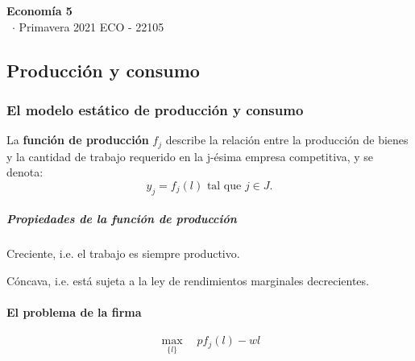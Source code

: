 \documentclass[8pt,a4paper]{extarticle}
\renewcommand{\csClass}{Economía 5}
\renewcommand{\csClassCode}{ECO - 22105}
\renewcommand{\csTerm}{Primavera 2021}
\begin{document}
\begin{titlepage}
	\begin{center}
		\vspace*{1cm}
		\Huge
		\textbf{\csClass}
		\vspace{0.5cm} \\
		\Large
		\cs\ $\cdot$ \csTerm
		\vfill
		\csAuthorName
		\vspace{0.8cm}
		\csClassCode\\
		\csSchool
	\end{center}
\end{titlepage}

\begin{multicols}{3}
	\setcounter{page}{1}

	\part{Producción y consumo}

	\section{El modelo estático de producción y consumo}

	\begin{boxdef}
		La \textbf{función de producción} $f_j$ describe la relación entre la producción de bienes y la cantidad de trabajo requerido en la j-ésima empresa competitiva, y se denota:
		\[
			y_j = f_j(l) \text{ tal que } j \in J
			.\]
	\end{boxdef}

	\subsubsection*{Propiedades de la función de producción}

	\begin{eqlist}
		\item Creciente, i.e. el trabajo es siempre productivo.
		\item Cóncava, i.e. está sujeta a la ley de rendimientos marginales decrecientes.
	\end{eqlist}

	\subsection{El problema de la firma}

	\begin{equation*}
		\max_{\{l\}} \quad pf_j (l) - wl
	\end{equation*}


\end{multicols}
\end{document}
